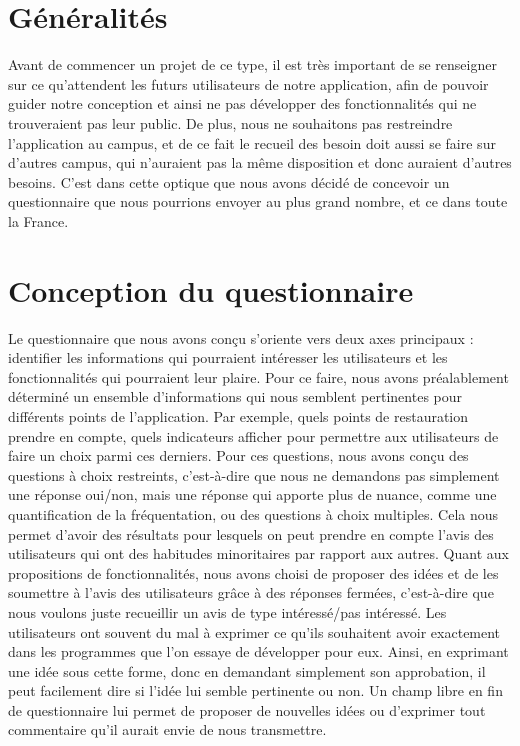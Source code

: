 
\section{Généralités}

Avant de commencer un projet de ce type, il est très important de se renseigner sur ce qu'attendent les futurs utilisateurs de notre application, afin de pouvoir guider notre conception et ainsi ne pas développer des fonctionnalités qui ne trouveraient pas leur public. De plus, nous ne souhaitons pas restreindre l'application au campus, et de ce fait le recueil des besoin doit aussi se faire sur d'autres campus, qui n'auraient pas la même disposition et donc auraient d'autres besoins. C’est dans cette optique que nous avons décidé de concevoir un questionnaire que nous pourrions envoyer au plus grand nombre, et ce dans toute la France.

\section{Conception du questionnaire}

Le questionnaire que nous avons conçu s'oriente vers deux axes principaux : identifier les informations qui pourraient intéresser les utilisateurs et les fonctionnalités qui pourraient leur plaire. \newline
Pour ce faire, nous avons préalablement déterminé un ensemble d'informations qui nous semblent pertinentes pour différents points de l'application. Par exemple, quels points de restauration prendre en compte, quels indicateurs afficher pour permettre aux utilisateurs de faire un choix parmi ces derniers. Pour ces questions, nous avons conçu des questions à choix restreints, c'est-à-dire que nous ne demandons pas simplement une réponse oui/non, mais une réponse qui apporte plus de nuance, comme une quantification de la fréquentation, ou des questions à choix multiples. Cela nous permet d'avoir des résultats pour lesquels on peut prendre en compte l'avis des utilisateurs qui ont des habitudes minoritaires par rapport aux autres. \newline
Quant aux propositions de fonctionnalités, nous avons choisi de proposer des idées et de les soumettre à l'avis des utilisateurs grâce à des réponses fermées, c'est-à-dire que nous voulons juste recueillir un avis de type intéressé/pas intéressé. Les utilisateurs ont souvent du mal à exprimer ce qu'ils souhaitent avoir exactement dans les programmes que l’on essaye de développer pour eux. Ainsi, en exprimant une idée sous cette forme, donc en demandant simplement son approbation, il peut facilement dire si l'idée lui semble pertinente ou non. Un champ libre en fin de questionnaire lui permet de proposer de nouvelles idées ou d'exprimer tout commentaire qu'il aurait envie de nous transmettre. \\

